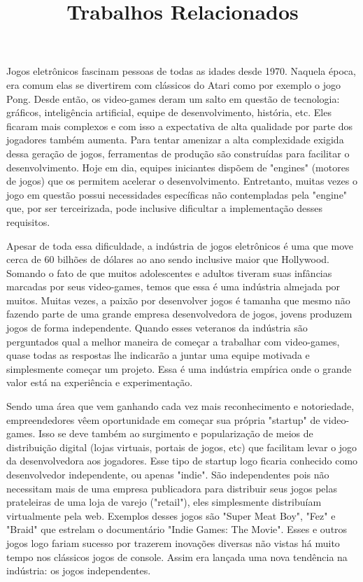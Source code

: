 

\title{Trabalhos Relacionados}

\maketitle

Jogos eletrônicos fascinam pessoas de todas as idades desde 1970. Naquela época, era comum elas se divertirem com clássicos do Atari como por exemplo o jogo Pong. Desde então, os video-games deram um salto em questão de tecnologia: gráficos, inteligência artificial, equipe de desenvolvimento, história, etc. Eles ficaram mais complexos e com isso a expectativa de alta qualidade por parte dos jogadores também aumenta. Para tentar amenizar a alta complexidade exigida dessa geração de jogos, ferramentas de produção são construídas para facilitar o desenvolvimento. Hoje em dia, equipes iniciantes dispõem de "engines" (motores de jogos) que os permitem acelerar o desenvolvimento. Entretanto, muitas vezes o jogo em questão possui necessidades específicas não contempladas pela "engine" que, por ser terceirizada, pode inclusive dificultar a implementação desses requisitos.

Apesar de toda essa dificuldade, a indústria de jogos eletrônicos é uma que move cerca de 60 bilhões de dólares ao ano sendo inclusive maior que Hollywood. Somando o fato de que muitos adolescentes e adultos tiveram suas infâncias marcadas por seus video-games, temos que essa é uma indústria almejada por muitos. Muitas vezes, a paixão por desenvolver jogos é tamanha que mesmo não fazendo parte de uma grande empresa desenvolvedora de jogos, jovens produzem jogos de forma independente. Quando esses veteranos da indústria são perguntados qual a melhor maneira de começar a trabalhar com video-games, quase todas as respostas lhe indicarão a juntar uma equipe motivada e simplesmente começar um projeto. Essa é uma indústria empírica onde o grande valor está na experiência e experimentação.

Sendo uma área que vem ganhando cada vez mais reconhecimento e notoriedade, empreendedores vêem oportunidade em começar sua própria "startup" de video-games. Isso se deve também ao surgimento e popularização de meios de distribuição digital (lojas virtuais, portais de jogos, etc) que facilitam levar o jogo da desenvolvedora aos jogadores. Esse tipo de startup logo ficaria conhecido como desenvolvedor independente, ou apenas "indie". São independentes pois não necessitam mais de uma empresa publicadora para distribuir seus jogos pelas prateleiras de uma loja de varejo ("retail"), eles simplesmente distribuíam virtualmente pela web. Exemplos desses jogos são "Super Meat Boy", "Fez" e "Braid" que estrelam o documentário "Indie Games: The Movie". Esses e outros jogos logo fariam sucesso por trazerem inovações diversas não vistas há muito tempo nos clássicos jogos de console. Assim era lançada uma nova tendência na indústria: os jogos independentes.


